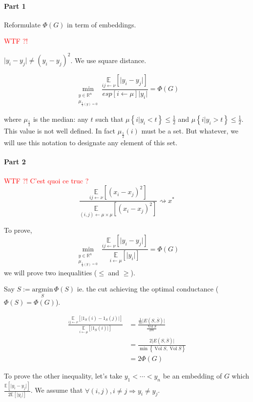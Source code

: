 \documentclass[12pt]{article}
\newcommand{\EE}{\mathbb{E}}
\newcommand{\RR}{\mathbb{R}}
\newcommand{\set}[1]{\left\{ #1 \right\}}
\newcommand{\wtf}[1]{\Huge\textcolor{red}{WTF ?! #1}\normalsize}
\newcommand{\argmin}{\text{argmin}}
\newcommand{\Ra}{\Rightarrow}
\newcommand{\la}{\leftarrow}
\newcommand{\esp}[2][]{\underset{#1}{\EE}\left[ #2 \right]}
\DeclareMathOperator{\vol}{Vol}
\begin{document}
\paragraph{Part 1}

Reformulate $\Phi(G)$ in term of embeddings.

\wtf{}

$\lvert y_i -y_j \rvert \neq (y_i-y_j)^2$. We use square distance.

\[
    \min\limits_{\substack{y\in\RR^n\\\mu_{\frac{1}{2}(y)=0}}} \frac{\esp[ij\la\nu]{\lvert y_i-y_j\rvert}}{esp[i\la\mu]{\lvert y_i \rvert}} = \Phi(G)
\]

where $\mu_{\frac{1}{2}}$ is the median: any $t$ such that $\mu\set{i\vert y_i < t} \leqslant \frac{1}{2}$ and $\mu\set{i\vert y_i >t} \leqslant \frac{1}{2}$. This value is not well defined. In fact $\mu_{\frac{1}{2}}(i)$ must be a set. But whatever, we will use this notation to designate any element of this set.


\paragraph{Part 2}
\wtf{C'est quoi ce truc ?}
\[
    \frac{\esp[ij\la\nu]{(x_i-x_j)^2}}{\esp[(i,j)\la\mu\times\mu]{(x_i-x_j)^2}} \rightsquigarrow x^*
\]



To prove,
\[
    \min\limits_{\substack{y\in\RR^n\\\mu_{\frac{1}{2}(y)=0}}} \frac{\esp[ij\la\nu]{\lvert y_i-y_j\rvert}}{\esp[i\la\mu]{\lvert y_i \rvert}} = \Phi(G)
\]
we will prove two inequalities ($\leqslant$ and $\geqslant$).

\bigskip

Say $S:=\underset{S}{\argmin}\,\Phi(S)$ ie. the cut achieving the optimal conductance ($\Phi(S) = \Phi(G)$).

\[
    \begin{aligned}
        \frac{\esp[ij\la\nu]{\lvert1_S(i)-1_S(j)\rvert}}{\esp[i\la\mu]{\lvert 1_S(i)\rvert}} &= \frac{\frac{1}{m}\lvert E(S,\overline{S})\rvert}{\frac{\vol S}{2m}}\\
        &= \frac{2\lvert E(S,\overline{S}) \rvert}{\min\set{\vol S, \vol \overline{S}}}\\
        &= 2 \Phi(G)
    \end{aligned}
\]

\bigskip

To prove the other inequality, let's take $y_1 < \cdots < y_n$ be an embedding of $G$ which $\frac{\esp{\lvert y_i-y_j\rvert}}{2\esp{\lvert y_i \rvert}}$. We assume that $\forall (i,j), i\neq j \Ra y_i \neq y_j$.
\end{document}

